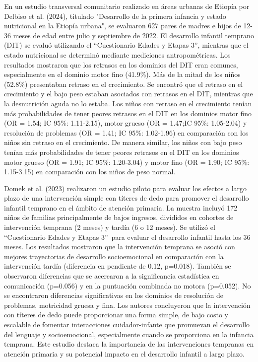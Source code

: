 \documentclass[11pt,letterpaper]{report}
\newcommand{\asq}{“Cuestionario Edades y Etapas 3”}
\begin{document}
En un estudio transversal comunitario realizado en áreas urbanas de Etiopía por
Delbiso et al. (2024), titulado "Desarrollo de la primera infancia y estado
nutricional en la Etiopía urbana", se evaluaron 627 pares de madres e hijos de
12-36 meses de edad entre julio y septiembre de 2022. El desarrollo infantil
temprano (DIT) se evaluó utilizando el \asq, mientras que el estado nutricional
se determinó mediante mediciones antropométricas. Los resultados mostraron que
los retrasos en los dominios del DIT eran comunes, especialmente en el dominio
motor fino (41.9\%). Más de la mitad de los niños (52.8\%) presentaban retraso
en el crecimiento. Se encontró que el retraso en el crecimiento y el bajo peso
estaban asociados con retrasos en el DIT, mientras que la desnutrición aguda no
lo estaba. Los niños con retraso en el crecimiento tenían más probabilidades de
tener peores retrasos en el DIT en los dominios motor fino (OR = 1.54; IC 95\%:
1.11-2.15), motor grueso (OR = 1.47;IC 95\%: 1.05-2.04) y resolución de
problemas (OR = 1.41; IC 95\%: 1.02-1.96) en comparación con los niños sin
retraso en el crecimiento. De manera similar, los niños con bajo peso tenían
más probabilidades de tener peores retrasos en el DIT en los dominios motor
grueso (OR = 1.91; IC 95\%: 1.20-3.04) y motor fino (OR = 1.90; IC 95\%:
1.15-3.15) en comparación con los niños de peso normal. \cite{Delbiso2024}

Domek et al. (2023) realizaron un estudio piloto para evaluar los efectos a
largo plazo de una intervención simple con títeres de dedo para promover el
desarrollo infantil temprano en el ámbito de atención primaria. La muestra
incluyó 172 niños de familias principalmente de bajos ingresos, divididos en
cohortes de intervención temprana (2 meses) y tardía (6 o 12 meses). Se utilizó
el \asq\ para evaluar el desarrollo infantil hasta los 36 meses. Los resultados
mostraron que la intervención temprana se asoció con mejores trayectorias de
desarrollo socioemocional en comparación con
la intervención tardía (diferencia en pendiente de 0.12, p=0.018). También se
observaron diferencias que se acercaron a la significancia estadística en
comunicación (p=0.056) y en la puntuación combinada no motora (p=0.052). No se
encontraron diferencias significativas en los dominios de resolución de
problemas, motricidad gruesa y fina. Los autores concluyeron que la
intervención con títeres de dedo puede proporcionar una forma simple, de bajo
costo y escalable de fomentar interacciones cuidador-infante que promuevan el
desarrollo del lenguaje y socioemocional, especialmente cuando se proporciona
en la infancia temprana. Este estudio destaca la importancia de las
intervenciones tempranas en atención primaria y su potencial impacto en el
desarrollo infantil a largo plazo. \cite{Domek2023}
\end{document}
